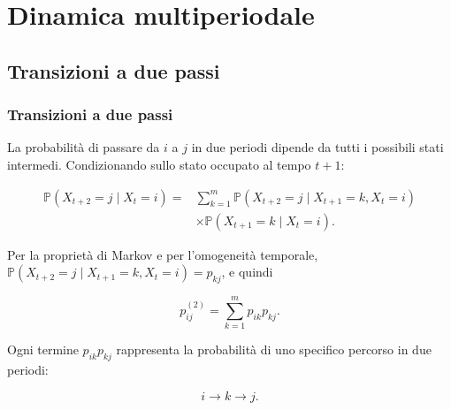 \documentclass[handout]{beamer}%
\providecommand{\Prob}{\mathbb{P}}
\providecommand{\QTR}[2]{\csname #1\endcsname{#2}}
\begin{document}


\section{Dinamica multiperiodale}

\subsection{Transizioni a due passi}%

\begin{frame}%
%

\frametitle{Transizioni a due passi}%
%

%


La probabilit\`{a} di passare da $i$ a $j$ in due periodi dipende da tutti i
possibili stati intermedi. Condizionando sullo stato occupato al tempo $t+1$:%

\[
\begin{aligned}
\Prob(X_{t+2}=j\mid X_{t}=i) = {} & \sum_{k=1}^{m} \Prob(X_{t+2}=j\mid X_{t+1}=k,X_{t}=i) \\
& \times \Prob(X_{t+1}=k\mid X_{t}=i).
\end{aligned}
\]


\medskip

Per la propriet\`{a} di Markov e per l'omogeneit\`{a} temporale,
$\Prob(X_{t+2}=j\mid X_{t+1}=k,X_{t}=i)=p_{kj}$, e quindi%

\[
p_{ij}^{(2)} = \sum_{k=1}^{m}p_{ik}p_{kj}.
\]


\medskip

Ogni termine $p_{ik}p_{kj}$ rappresenta la probabilit\`{a} di uno specifico
percorso in due periodi:%

\[
i\longrightarrow k\longrightarrow j.
\]
%

\transboxout
\end{frame}%


\end{document}
